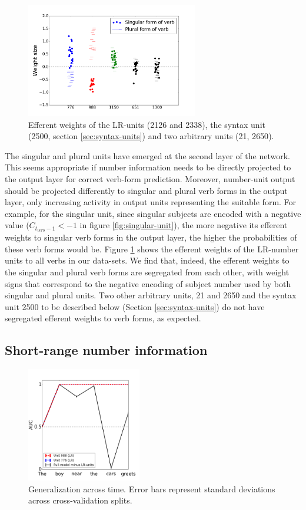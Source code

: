 \begin{figure}[b]
    \centering
    \includegraphics[height=5cm]{Figures/weight_dists_verbs.png}
    \caption{Efferent weights of the LR-units (\unit{2}{126} and \unit{2}{338}), the syntax unit (\unit{2}{500}, section \ref{sec:syntax-units}) and two arbitrary units (\unit{2}{1}, \unit{2}{650}).}
    \label{fig:output-weights}
\end{figure}

The singular and plural units have emerged at the second layer of the network. This seems appropriate if number information needs to be directly projected to the output layer for correct verb-form prediction. Moreover, number-unit output should be projected differently to singular and plural verb forms in the output layer, only increasing activity in output units representing the suitable form. For example, for the singular unit, since singular subjects are encoded with a negative value ($C_{t_{verb}-1}<-1$ in figure \ref{fig:singular-unit}), the more negative its efferent weights to singular verb forms in the output layer, the higher the probabilities of these verb forms would be. Figure \ref{fig:output-weights} shows the efferent weights of the LR-number units to all verbs in our data-sets. We find that, indeed, the efferent weights to the singular and plural verb forms are segregated from each other, with weight signs that correspond to the negative encoding of subject number used by both singular and plural units. Two other arbitrary units, \unit{2}{1} and \unit{2}{650} and the syntax unit \unit{2}{500} to be described below (Section \ref{sec:syntax-units}) do not have segregated efferent weights to verb forms, as expected. 

\subsection{Short-range number information}
\begin{figure}
    \centering
    \includegraphics[height=5cm]{Figures/GAT1d_cell_.png}
    \caption{Generalization across time. Error bars represent standard deviations across cross-validation splits.}
    \label{fig:GAT}
\end{figure}

